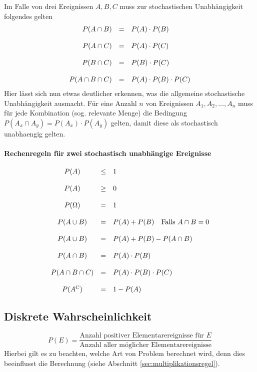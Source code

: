 Im Falle von drei Ereignissen $A,B,C$ muss zur stochastischen
Unabhängigkeit folgendes gelten
\[ \begin{array}{r c l}
	P(A \cap B)
		& = 
		& P(A) \cdot P(B) \\
	& & \\
	P(A \cap C)
		& =
		& P(A) \cdot P(C) \\
	& & \\
	P(B \cap C)
		& =
		& P(B) \cdot P(C) \\
	& & \\
	P(A \cap B \cap C)
		& =
		& P(A) \cdot P(B) \cdot P(C)
\end{array} \]
Hier lässt sich nun etwas deutlicher erkennen, was die allgemeine
stochastische Unabhängigkeit ausmacht. 
Für eine Anzahl $n$ von Ereignissen 
$A_1, A_2, \dots , A_n $ 
muss für jede Kombination (sog. relevante Menge) die Bedingung
$P(A_x \cap A_y) = P(A_x) \cdot P(A_y)$ gelten, damit diese
als \gls{stochastisch unabhaengig} gelten. 

\paragraph{Rechenregeln für zwei stochastisch unabhängige Ereignisse}
\[ \begin{array}{c c l}
	P(A)	
		& \leq
		& 1 \\
	& & \\
	P(A) 
		& \geq 
		& 0 \\
	& & \\
	P(\Omega) 
		& = 
		& 1 \\
	& & \\
	P(A \cup B) 
		& = 
		& P(A) + P(B) \quad \text{Falls } A \cap B = 0 \\
	& & \\
	P(A \cup B) 
		& = 
		& P(A) + P(B) - P(A \cap B) \\
	& & \\
	P(A \cap B) 
		& = 
		& P(A) \cdot P(B) \\
	& & \\
	P(A \cap B \cap C) 
		& = 
		& P(A) \cdot P(B) \cdot P(C) \\
	& & \\
	P(A^{\mathrm C}) 
		& = 
		& 1 - P(A)
\end{array} \]
	
\subsection{Diskrete Wahrscheinlichkeit}
\[ 
	P(E)
	= \frac{\text{Anzahl positiver Elementarereignisse für } E}{
		\text{Anzahl aller möglicher Elementarereignisse}}
\]
Hierbei gilt es zu beachten, welche Art von Problem berechnet wird, denn
dies beeinflusst die Berechnung (siehe Abschnitt 
\ref{sec:multiplikationsregel}).

